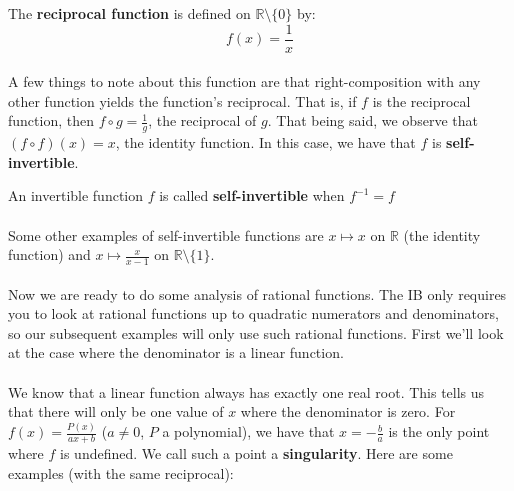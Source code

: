 \documentclass[12pt, a4paper, titlepage, twoside]{article}
\newcommand*{\R}{\mathbb{R}}
\begin{document}
	\begin{kp}
		The \textbf{reciprocal function} is defined on $\R \setminus \{0\}$ by:
		\[ f(x) = \dfrac{1}{x} \]
	\end{kp}
	
	\paragraph{}
	A few things to note about this function are that right-composition with any other function yields the function's reciprocal.
	That is, if $f$ is the reciprocal function, then $f \circ g = \frac{1}{g}$, the reciprocal of $g$. That being said, we observe that 
	$(f \circ f)(x) = x$, the identity function. In this case, we have that $f$ is \textbf{self-invertible}.\\
	
	\begin{kp}
		An invertible function $f$ is called \textbf{self-invertible} when $f^{-1} = f$
	\end{kp}
		
	\paragraph{}
	Some other examples of self-invertible functions are $x \mapsto x$ on $\R$ (the identity function) and $x \mapsto \frac{x}{x-1}$ on
	$\R \setminus \{1\}$. 
	
	\paragraph{}
	Now we are ready to do some analysis of rational functions. The IB only requires you to look at rational functions up to quadratic numerators
	and denominators, so our subsequent examples will only use such rational functions. First we'll look at the case where the denominator is a 
	linear function. 
	
	\paragraph{}
	We know that a linear function always has exactly one real root. This tells us that there will only be one value of $x$ where the denominator
	is zero. For $f(x) = \frac{P(x)}{ax+b}$ ($a \neq 0$, $P$ a polynomial), we have that $x = -\frac{b}{a}$ is the only point where $f$ is undefined. 
	We call such a point a \textbf{singularity}. Here are some examples (with the same reciprocal):
	
\end{document}
